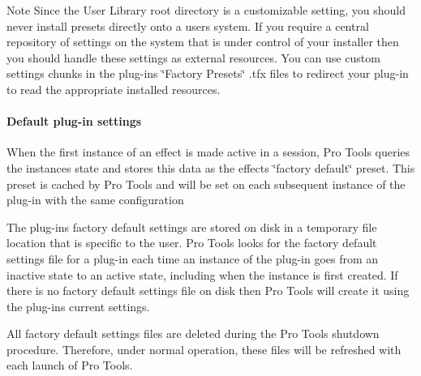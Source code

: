 \begin{DoxyNote}{Note}
Since the User Library root directory is a customizable setting, you should never install presets directly onto a user\textquotesingle{}s system. If you require a central repository of settings on the system that is under control of your installer then you should handle these settings as external resources. You can use custom settings chunks in the plug-\/in\textquotesingle{}s \char`\"{}\+Factory Presets\char`\"{} .tfx files to redirect your plug-\/in to read the appropriate installed resources.
\end{DoxyNote}
\hypertarget{a00830_subsubsection__default_plugin_settings_}{}\paragraph{Default plug-\/in settings}\label{a00830_subsubsection__default_plugin_settings_}
 When the first instance of an effect is made active in a session, Pro Tools queries the instance\textquotesingle{}s state and stores this data as the effect\textquotesingle{}s \char`\"{}factory default\char`\"{} preset. This preset is cached by Pro Tools and will be set on each subsequent instance of the plug-\/in with the same configuration

The plug-\/in\textquotesingle{}s factory default settings are stored on disk in a temporary file location that is specific to the user. Pro Tools looks for the factory default settings file for a plug-\/in each time an instance of the plug-\/in goes from an inactive state to an active state, including when the instance is first created. If there is no factory default settings file on disk then Pro Tools will create it using the plug-\/in\textquotesingle{}s current settings.

All factory default settings files are deleted during the Pro Tools shutdown procedure. Therefore, under normal operation, these files will be refreshed with each launch of Pro Tools.


